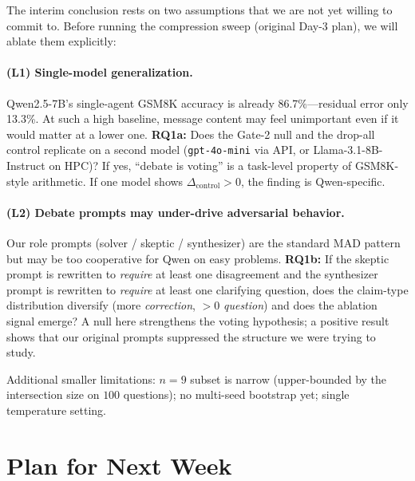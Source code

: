 \begin{itemize}
The interim conclusion rests on two assumptions that we are not yet willing to commit to. Before running the compression sweep (original Day-3 plan), we will ablate them explicitly:

\paragraph{(L1) Single-model generalization.}
Qwen2.5-7B's single-agent GSM8K accuracy is already 86.7\%---residual error only 13.3\%. At such a high baseline, message content may feel unimportant even if it would matter at a lower one. \textbf{RQ1a:} Does the Gate-2 null and the drop-all control replicate on a second model (\texttt{gpt-4o-mini} via API, or Llama-3.1-8B-Instruct on HPC)? If yes, ``debate is voting'' is a task-level property of GSM8K-style arithmetic. If one model shows $\Delta_{\text{control}} > 0$, the finding is Qwen-specific.

\paragraph{(L2) Debate prompts may under-drive adversarial behavior.}
Our role prompts (solver / skeptic / synthesizer) are the standard MAD pattern but may be too cooperative for Qwen on easy problems. \textbf{RQ1b:} If the skeptic prompt is rewritten to \textit{require} at least one disagreement and the synthesizer prompt is rewritten to \textit{require} at least one clarifying question, does the claim-type distribution diversify (more \textit{correction}, $>0$ \textit{question}) and does the ablation signal emerge? A null here strengthens the voting hypothesis; a positive result shows that our original prompts suppressed the structure we were trying to study.

Additional smaller limitations: $n=9$ subset is narrow (upper-bounded by the intersection size on $100$ questions); no multi-seed bootstrap yet; single temperature setting.

\section*{Plan for Next Week}


\end{itemize}
